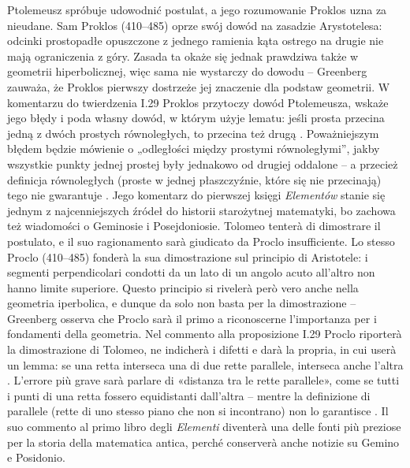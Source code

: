 Ptolemeusz spróbuje udowodnić postulat, a jego rozumowanie Proklos uzna za nieudane. %
Sam Proklos (410--485) oprze swój dowód na zasadzie Arystotelesa: odcinki prostopadłe opuszczone z jednego ramienia kąta ostrego na drugie nie mają ograniczenia z góry. %
Zasada ta okaże się jednak prawdziwa także w geometrii hiperbolicznej, więc sama nie wystarczy do dowodu -- Greenberg \cite[s. 205, 207, 210]{greenberg_2010} zauważa, że Proklos pierwszy dostrzeże jej znaczenie dla podstaw geometrii. %
W komentarzu do twierdzenia I.29 Proklos przytoczy dowód Ptolemeusza, wskaże jego błędy i poda własny dowód, w którym użyje lematu: jeśli prosta przecina jedną z dwóch prostych równoległych, to przecina też drugą \cite[s. 297]{hartshorne_2000}. %
Poważniejszym błędem będzie mówienie o „odległości między prostymi równoległymi'', jakby wszystkie punkty jednej prostej były jednakowo od drugiej oddalone -- a przecież definicja równoległych (proste w jednej płaszczyźnie, które się nie przecinają) tego nie gwarantuje \cite[s. 298]{hartshorne_2000}. %
Jego komentarz do pierwszej księgi \emph{Elementów} stanie się jednym z najcenniejszych źródeł do historii starożytnej matematyki, bo zachowa też wiadomości o Geminosie i Posejdoniosie. %
Tolomeo tenterà di dimostrare il postulato, e il suo ragionamento sarà giudicato da Proclo insufficiente. %
Lo stesso Proclo (410--485) fonderà la sua dimostrazione sul principio di Aristotele: i segmenti perpendicolari condotti da un lato di un angolo acuto all'altro non hanno limite superiore. %
Questo principio si rivelerà però vero anche nella geometria iperbolica, e dunque da solo non basta per la dimostrazione -- Greenberg \cite[p. 205, 207, 210]{greenberg_2010} osserva che Proclo sarà il primo a riconoscerne l'importanza per i fondamenti della geometria. %
Nel commento alla proposizione I.29 Proclo riporterà la dimostrazione di Tolomeo, ne indicherà i difetti e darà la propria, in cui userà un lemma: se una retta interseca una di due rette parallele, interseca anche l'altra \cite[p. 297]{hartshorne_2000}. %
L'errore più grave sarà parlare di «distanza tra le rette parallele», come se tutti i punti di una retta fossero equidistanti dall'altra -- mentre la definizione di parallele (rette di uno stesso piano che non si incontrano) non lo garantisce \cite[p. 298]{hartshorne_2000}. %
Il suo commento al primo libro degli \emph{Elementi} diventerà una delle fonti più preziose per la storia della matematica antica, perché conserverà anche notizie su Gemino e Posidonio. %

